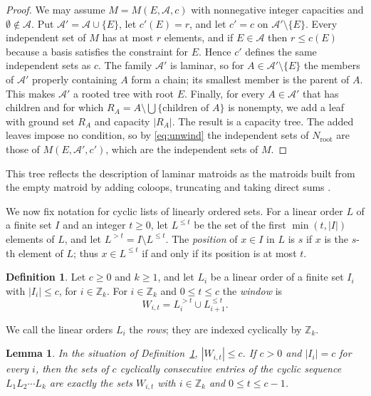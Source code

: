 \documentclass[11pt]{amsart}
\newtheorem{lemma}[theorem]{Lemma}
\theoremstyle{definition}
\newtheorem{definition}[theorem]{Definition}
\theoremstyle{remark}
\numberwithin{equation}{section}
\newcommand{\Z}{\mathbb{Z}}
\newcommand{\cA}{\mathcal{A}}
\begin{document}
\begin{proof}
We may assume $M=M(E,\cA,c)$ with nonnegative integer capacities \cite[Section~2]{FO} and $\emptyset\notin\cA$. Put $\cA'=\cA\cup\{E\}$, let $c'(E)=r$, and let $c'=c$ on $\cA'\setminus\{E\}$. Every independent set of $M$ has at most $r$ elements, and if $E\in\cA$ then $r\le c(E)$ because a basis satisfies the constraint for $E$. Hence $c'$ defines the same independent sets as $c$. The family $\cA'$ is laminar, so for $A\in\cA'\setminus\{E\}$ the members of $\cA'$ properly containing $A$ form a chain; its smallest member is the parent of $A$. This makes $\cA'$ a rooted tree with root $E$. Finally, for every $A\in\cA'$ that has children and for which $R_A=A\setminus\bigcup\{\text{children of }A\}$ is nonempty, we add a leaf with ground set $R_A$ and capacity $|R_A|$. The result is a capacity tree. The added leaves impose no condition, so by \eqref{eq:unwind} the independent sets of $N_{\mathrm{root}}$ are those of $M(E,\cA',c')$, which are the independent sets of $M$.
\end{proof}

This tree reflects the description of laminar matroids as the matroids built from the empty matroid by adding coloops, truncating and taking direct sums \cite[Theorem~1.5]{FO}.

We now fix notation for cyclic lists of linearly ordered sets. For a linear order $L$ of a finite set $I$ and an integer $t\ge0$, let $L^{\le t}$ be the set of the first $\min(t,|I|)$ elements of $L$, and let $L^{>t}=I\setminus L^{\le t}$. The \emph{position} of $x\in I$ in $L$ is $s$ if $x$ is the $s$-th element of $L$; thus $x\in L^{\le t}$ if and only if its position is at most $t$.

\begin{definition}\label{def:windows}
Let $c\ge0$ and $k\ge1$, and let $L_i$ be a linear order of a finite set $I_i$ with $|I_i|\le c$, for $i\in\Z_k$. For $i\in\Z_k$ and $0\le t\le c$ the \emph{window} is
\[
W_{i,t}=L_i^{>t}\cup L_{i+1}^{\le t}.
\]
\end{definition}

We call the linear orders $L_i$ the \emph{rows}; they are indexed cyclically by $\Z_k$.

\begin{lemma}\label{lem:windows}
In the situation of Definition~\ref{def:windows}, $|W_{i,t}|\le c$. If $c>0$ and $|I_i|=c$ for every $i$, then the sets of $c$ cyclically consecutive entries of the cyclic sequence $L_1L_2\cdots L_k$ are exactly the sets $W_{i,t}$ with $i\in\Z_k$ and $0\le t\le c-1$.
\end{lemma}
\end{document}
